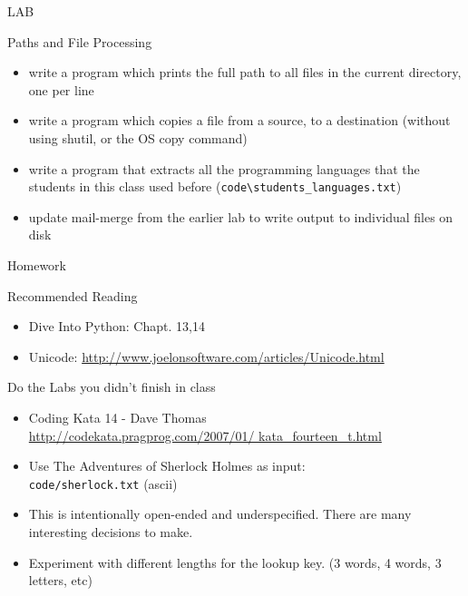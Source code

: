 \documentclass{beamer}
\begin{document}
\begin{frame}[fragile]{LAB}

{\Large Paths and File Processing}

\begin{itemize}
  \item write a program which prints the full path to all files
    in the current directory, one per line
  \item write a program which copies a file from a source, to a
        destination (without using shutil, or the OS copy command)
  \item write a program that extracts all the programming languages that the students in this class used before (\verb|code\students_languages.txt|) 
  \item update mail-merge from the earlier lab to write output
         to individual files on disk
\end{itemize}

\end{frame}


\begin{frame}[fragile]{Homework}

{\large Recommended Reading}
\begin{itemize}
  \item Dive Into Python: Chapt. 13,14
  \item Unicode: \url{http://www.joelonsoftware.com/articles/Unicode.html}
\end{itemize}

\vfill
{\large Do the Labs you didn't finish in class}

\vfill
\begin{itemize}
  \item Coding Kata 14 - Dave Thomas \\
    \url{http://codekata.pragprog.com/2007/01/ kata_fourteen_t.html}

  \item Use The Adventures of Sherlock Holmes as input:\\
        \verb|code/sherlock.txt| (ascii)

  \item  This is intentionally open-ended and underspecified. There are many interesting decisions to make.

  \item Experiment with different lengths for the lookup key. (3 words, 4 words, 3 letters, etc)
\end{itemize}

\end{frame}
\end{document}
